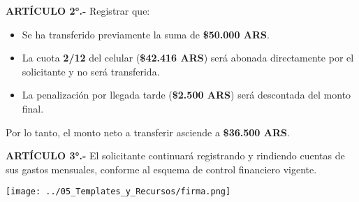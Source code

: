 \documentclass[12pt]{article}
\begin{document}
\textbf{ARTÍCULO 2°.-}
Registrar que: \begin{itemize} \item Se ha transferido previamente la suma de \textbf{\$50.000 ARS}. \item La cuota \textbf{2/12} del celular (\textbf{\$42.416 ARS}) será abonada directamente por el solicitante y no será transferida. \item La penalización por llegada tarde (\textbf{\$2.500 ARS}) será descontada del monto final. \end{itemize} Por lo tanto, el monto neto a transferir asciende a \textbf{\$36.500 ARS}.
\vspace{0.5cm}

\textbf{ARTÍCULO 3°.-}
El solicitante continuará registrando y rindiendo cuentas de sus gastos mensuales, conforme al esquema de control financiero vigente.
\vspace{0.5cm}


\vspace{1.4cm}

\begin{flushright}
  \texttt{[image: ../05\_Templates\_y\_Recursos/firma.png]}
\end{flushright}

\end{document}
